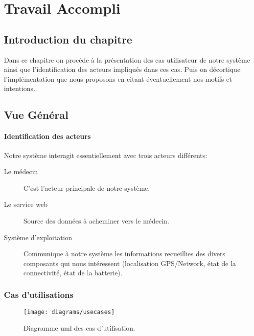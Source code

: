 
\chapter{Travail Accompli}

\section{Introduction du chapitre}

Dans ce chapitre on procède à la présentation des cas utilisateur de
notre système ainsi que l'identification des acteurs impliqués dans ces
cas. Puis on décortique l’implémentation que nous proposons en citant
éventuellement nos motifs et intentions.

\section{Vue Général}
\subsubsection{Identification des acteurs}

Notre système interagit essentiellement avec trois acteurs différents:

\begin{description}
\item[Le médecin] C'est l'acteur principale de notre système.

\item[Le service web] Source des données à acheminer vers le médecin.

\item[Système d'exploitation] Communique à notre système les
informations recueillies des divers composants qui nous intéressent
(localisation GPS/Network, état de la connectivité, état de la
batterie).

\end{description}

\subsection{Cas d'utilisations}

\begin{figure}
\center
\texttt{[image: diagrams/usecases]}
\caption{Diagramme \gls{uml} des cas d'utilisation.}
\label{fig:usecase}
\end{figure}

